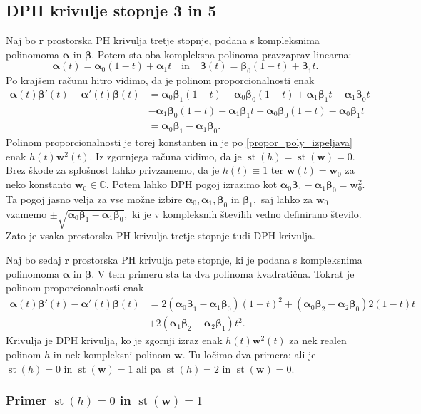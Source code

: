 \documentclass[12pt,a4paper,twoside]{article}
\theoremstyle{definition} %
\theoremstyle{plain} %
\theoremstyle{primerstyle}
\numberwithin{equation}{section}  %
\renewcommand{\C}{\mathbb C}
\newcommand{\rV}{\mathbf{r}}
\newcommand{\wV}{\mathbf{w}}
\newcommand{\balpha}{\boldsymbol \alpha}
\newcommand{\bbeta}{\boldsymbol \beta}
\DeclareMathOperator{\st}{st}
\begin{document}
\subsection{DPH krivulje stopnje 3 in 5}

Naj bo $\rV$ prostorska PH krivulja tretje stopnje, podana s kompleksnima polinomoma $\balpha$ in $\bbeta.$ Potem sta oba kompleksna polinoma pravzaprav linearna: $$\balpha(t)=\balpha_0(1-t)+\balpha_1t\quad\text{in}\quad\bbeta(t)=\bbeta_0(1-t)+\bbeta_1t.$$ Po krajšem računu hitro vidimo, da je polinom proporcionalnosti enak
\begin{align*}
	\balpha(t)\bbeta'(t)-\balpha'(t)\bbeta(t)&=\balpha_0\bbeta_1(1-t)-\balpha_0\bbeta_0(1-t)+\balpha_1\bbeta_1t-\balpha_1\bbeta_0t\\
	&-\balpha_1\bbeta_0(1-t)-\balpha_1\bbeta_1t+\balpha_0\bbeta_0(1-t)-\balpha_0\bbeta_1t\\
	&=\balpha_0\bbeta_1-\balpha_1\bbeta_0.
\end{align*}
Polinom proporcionalnosti je torej konstanten in je po \eqref{propor_poly_izpeljava} enak $h(t)\wV^2(t).$ Iz zgornjega računa vidimo, da je $\st(h)=\st(\wV)=0.$ Brez škode za splošnost lahko privzamemo, da je $h(t)\equiv1$ ter $\wV(t)=\wV_0$ za neko konstanto $\wV_0\in\C.$ Potem lahko DPH pogoj izrazimo kot $\balpha_0\bbeta_1-\balpha_1\bbeta_0=\wV_0^2.$ Ta pogoj jasno velja za vse možne izbire $\balpha_0,\balpha_1,\bbeta_0$ in $\bbeta_1,$ saj lahko za $\wV_0$ vzamemo $\pm\sqrt{\balpha_0\bbeta_1-\balpha_1\bbeta_0},$ ki je v kompleksnih številih vedno definirano število. Zato je vsaka prostorska PH krivulja tretje stopnje tudi DPH krivulja.

Naj bo sedaj $\rV$ prostorska PH krivulja pete stopnje, ki je podana s kompleksnima polinomoma $\balpha$ in $\bbeta.$ V tem primeru sta ta dva polinoma kvadratična. Tokrat je polinom proporcionalnosti enak
\begin{align}
	\balpha(t)\bbeta'(t)-\balpha'(t)\bbeta(t)&=2(\balpha_0\bbeta_1-\balpha_1\bbeta_0)(1-t)^2+(\balpha_0\bbeta_2-\balpha_2\bbeta_0)2(1-t)t\nonumber\\
	&+2(\balpha_1\bbeta_2-\balpha_2\bbeta_1)t^2.\label{propoly_bern_5}
\end{align}
Krivulja je DPH krivulja, ko je zgornji izraz enak $h(t)\wV^2(t)$ za nek realen polinom $h$ in nek kompleksni polinom $\wV.$ Tu ločimo dva primera: ali je $\st(h)=0$ in $\st(\wV)=1$ ali pa $\st(h)=2$ in $\st(\wV)=0.$

\subsubsection{Primer \texorpdfstring{$\st(h)=0$}{st(h)=0} in \texorpdfstring{$\st(\wV)=1$}{st(w)=1}}
\end{document}
